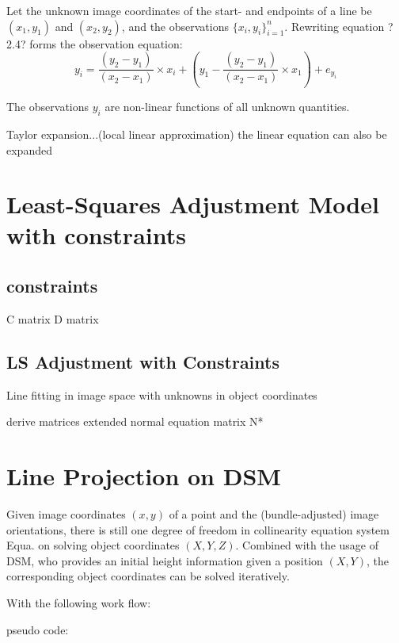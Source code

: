 Let the unknown image coordinates of the start- and endpoints of a line be $(x_1,y_1)$ and $(x_2,y_2)$, and the observations $\{x_i,y_i\}^n_{i=1}$. Rewriting equation ?2.4? forms the observation equation:
\begin{equation} %
y_i = \dfrac{(y_2-y_1)}{(x_2-x_1)}\times x_i+(y_1-\dfrac{(y_2-y_1)}{(x_2-x_1)}\times x_1) + e_{y_i}
\end{equation}

The observations $y_i$ are non-linear functions of all unknown quantities.

Taylor expansion...(local linear approximation)
the linear equation can also be expanded


\section{Least-Squares Adjustment Model with constraints}
\label{sec:}


\subsection{constraints}
\label{subsec:}

C matrix
D matrix

\subsection{LS Adjustment with Constraints}
\label{sec:}
Line fitting in image space with unknowns in object coordinates


derive matrices
extended normal equation matrix N*


\section{Line Projection on DSM}
\label{sec:LineProjectionOnDSM}

Given image coordinates $(x,y)$ of a point and the (bundle-adjusted) image orientations, there is still one degree of freedom in collinearity equation system Equa. on solving object coordinates $(X,Y,Z)$. Combined with the usage of DSM, who provides an initial height information given a position $(X,Y)$, the corresponding object coordinates can be solved iteratively.

With the following work flow:

pseudo code:

